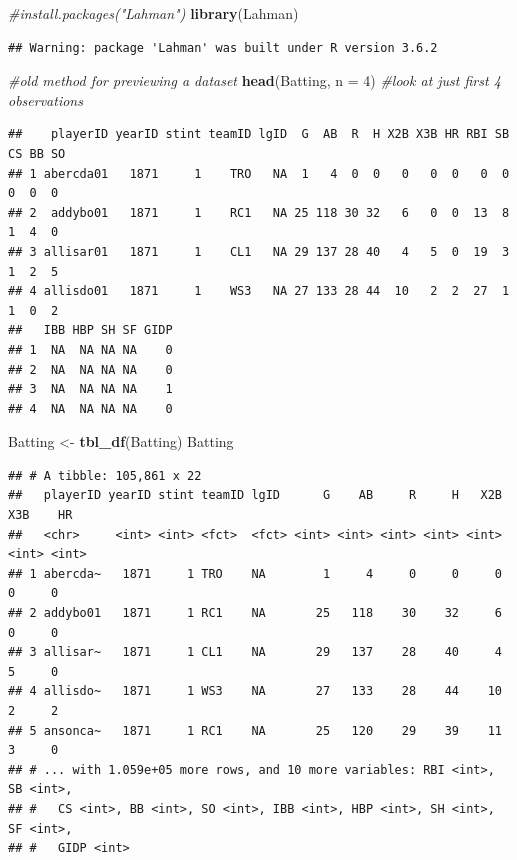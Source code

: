\documentclass[
]{book}
\newenvironment{Shaded}{\begin{snugshade}}{\end{snugshade}}
\newcommand{\CommentTok}[1]{\textcolor[rgb]{0.56,0.35,0.01}{\textit{#1}}}
\newcommand{\DataTypeTok}[1]{\textcolor[rgb]{0.13,0.29,0.53}{#1}}
\newcommand{\DecValTok}[1]{\textcolor[rgb]{0.00,0.00,0.81}{#1}}
\newcommand{\KeywordTok}[1]{\textcolor[rgb]{0.13,0.29,0.53}{\textbf{#1}}}
\newcommand{\NormalTok}[1]{#1}
\newcommand{\StringTok}[1]{\textcolor[rgb]{0.31,0.60,0.02}{#1}}
\theoremstyle{definition}
\theoremstyle{definition}
\theoremstyle{definition}
\theoremstyle{remark}
\begin{document}
\begin{Shaded}
\begin{Highlighting}[]
\CommentTok{#install.packages("Lahman")}
\KeywordTok{library}\NormalTok{(Lahman)}
\end{Highlighting}
\end{Shaded}

\begin{verbatim}
## Warning: package 'Lahman' was built under R version 3.6.2
\end{verbatim}

\begin{Shaded}
\begin{Highlighting}[]
\CommentTok{#old method for previewing a dataset}
\KeywordTok{head}\NormalTok{(Batting, }\DataTypeTok{n =} \DecValTok{4}\NormalTok{) }\CommentTok{#look at just first 4 observations}
\end{Highlighting}
\end{Shaded}

\begin{verbatim}
##    playerID yearID stint teamID lgID  G  AB  R  H X2B X3B HR RBI SB CS BB SO
## 1 abercda01   1871     1    TRO   NA  1   4  0  0   0   0  0   0  0  0  0  0
## 2  addybo01   1871     1    RC1   NA 25 118 30 32   6   0  0  13  8  1  4  0
## 3 allisar01   1871     1    CL1   NA 29 137 28 40   4   5  0  19  3  1  2  5
## 4 allisdo01   1871     1    WS3   NA 27 133 28 44  10   2  2  27  1  1  0  2
##   IBB HBP SH SF GIDP
## 1  NA  NA NA NA    0
## 2  NA  NA NA NA    0
## 3  NA  NA NA NA    1
## 4  NA  NA NA NA    0
\end{verbatim}

\begin{Shaded}
\begin{Highlighting}[]
\NormalTok{Batting <-}\StringTok{ }\KeywordTok{tbl_df}\NormalTok{(Batting)}
\NormalTok{Batting}
\end{Highlighting}
\end{Shaded}

\begin{verbatim}
## # A tibble: 105,861 x 22
##   playerID yearID stint teamID lgID      G    AB     R     H   X2B   X3B    HR
##   <chr>     <int> <int> <fct>  <fct> <int> <int> <int> <int> <int> <int> <int>
## 1 abercda~   1871     1 TRO    NA        1     4     0     0     0     0     0
## 2 addybo01   1871     1 RC1    NA       25   118    30    32     6     0     0
## 3 allisar~   1871     1 CL1    NA       29   137    28    40     4     5     0
## 4 allisdo~   1871     1 WS3    NA       27   133    28    44    10     2     2
## 5 ansonca~   1871     1 RC1    NA       25   120    29    39    11     3     0
## # ... with 1.059e+05 more rows, and 10 more variables: RBI <int>, SB <int>,
## #   CS <int>, BB <int>, SO <int>, IBB <int>, HBP <int>, SH <int>, SF <int>,
## #   GIDP <int>
\end{verbatim}
\end{document}
